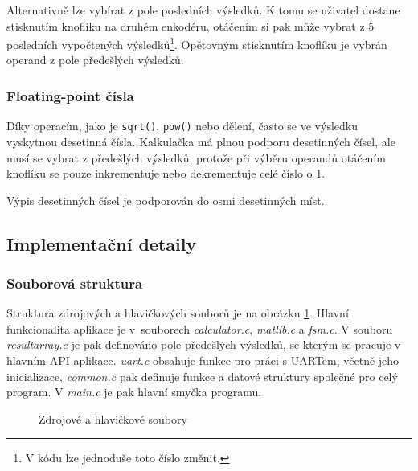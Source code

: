\documentclass[a4paper, 11pt]{article}
\begin{document}
Alternativně lze vybírat z pole posledních výsledků.
K tomu se uživatel dostane stisknutím knoflíku na druhém enkodéru, otáčením si pak může vybrat z 5 posledních vypočtených výsledků\footnote{V kódu lze jednoduše toto číslo změnit.}.
Opětovným stisknutím knoflíku je vybrán operand z pole předešlých výsledků.

\subsubsection{Floating-point čísla}\label{2_1_2:floating_point}

Díky operacím, jako je \texttt{sqrt()}, \texttt{pow()} nebo dělení, často se ve výsledku vyskytnou desetinná čísla. 
Kalkulačka má plnou podporu desetinných čísel, ale musí se vybrat z předešlých výsledků, protože při výběru operandů otáčením knoflíku se pouze inkrementuje nebo dekrementuje celé číslo o 1.

Výpis desetinných čísel je podporován do osmi desetinných míst.

\subsection{Implementační detaily}\label{2_2:implementace}

\subsubsection{Souborová struktura}\label{2_2_1:struktura}
Struktura zdrojových a hlavičkových souborů je na obrázku \ref{img:zdrojove_soubory}. Hlavní funkcionalita aplikace je v~souborech \emph{calculator.c}, \emph{matlib.c} a \emph{fsm.c}. V souboru \emph{result\textunderscore array.c} je pak definováno pole předešlých výsledků, se kterým se pracuje v hlavním API aplikace. \emph{uart.c} obsahuje funkce pro práci s UARTem, včetně jeho inicializace, \emph{common.c} pak definuje funkce a datové struktury společné pro celý program. V \emph{main.c} je pak hlavní smyčka programu.

\begin{figure}[t]
    \centering
    \begin{minipage}{0.26\textwidth}
    \end{minipage}
    \caption{Zdrojové a hlavičkové soubory}
    \label{img:zdrojove_soubory}
\end{figure}
\end{document}

